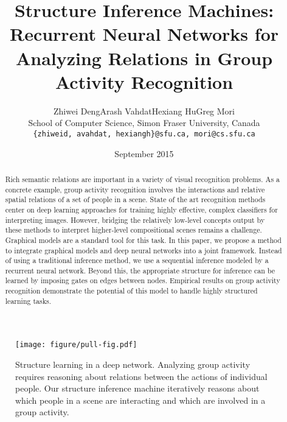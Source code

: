 \documentclass[10pt,twocolumn,letterpaper]{article}
\begin{document}
\title{Structure Inference Machines: Recurrent Neural Networks for Analyzing Relations in Group Activity Recognition}

\author{Zhiwei Deng\qquad Arash Vahdat\qquad Hexiang Hu\qquad  Greg Mori\\School of Computer Science, Simon Fraser University, Canada\\
{\tt\small \{zhiweid, avahdat, hexiangh\}@sfu.ca, mori@cs.sfu.ca}
}


\date{September 2015}

\maketitle


\begin{abstract}

Rich semantic relations are important in a variety of visual recognition problems.  As a concrete example, group activity recognition involves the interactions and relative spatial relations of a set of people in a scene.
State of the art recognition methods center on deep learning approaches for training highly effective, complex classifiers for interpreting images.  However, bridging the relatively low-level concepts output by these methods to interpret higher-level compositional scenes remains a challenge.  Graphical models are a standard tool for this task.
In this paper, we propose a method to integrate graphical models and deep neural networks into a joint framework. Instead of using a traditional inference method, we use a sequential inference modeled by a recurrent neural network. Beyond this, the appropriate structure for inference can be learned by imposing gates on edges between nodes.  Empirical results on group activity recognition demonstrate the potential of this model to handle highly structured learning tasks.
   
\end{abstract}



\begin{figure}[htb]
\begin{center}
  \texttt{[image: figure/pull-fig.pdf]}
\end{center}
\caption{Structure learning in a deep network.  Analyzing group activity requires reasoning about relations between the actions of individual people.  Our structure inference machine iteratively reasons about which people in a scene are interacting and which are involved in a group activity.}
\label{fig:pull-fig}
\end{figure}
\vspace{-3mm}
\end{document}
